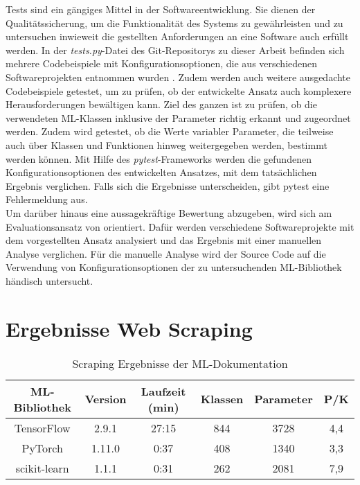 \documentclass[german,bachelor]{swsLeipzig}
\begin{document}
\noindent Tests sind ein gängiges Mittel in der Softwareentwicklung.
Sie dienen der Qualitätssicherung, um die Funktionalität des Systems zu gewährleisten und zu untersuchen inwieweit
die gestellten Anforderungen an eine Software auch erfüllt werden.
In der \textit{tests.py}-Datei des Git-Repositorys zu dieser Arbeit befinden sich mehrere Codebeispiele mit Konfigurationsoptionen, die aus
verschiedenen Softwareprojekten entnommen wurden \cite[]{marco}.
Zudem werden auch weitere ausgedachte Codebeispiele getestet, um zu prüfen, ob der entwickelte
Ansatz auch komplexere Herausforderungen bewältigen kann.
Ziel des ganzen ist zu prüfen, ob die verwendeten ML-Klassen inklusive der Parameter richtig erkannt und zugeordnet werden.
Zudem wird getestet, ob die Werte variabler Parameter, die teilweise auch über Klassen und Funktionen hinweg weitergegeben werden,
bestimmt werden können.
Mit Hilfe des \textit{pytest}-Frameworks werden die gefundenen Konfigurationsoptionen des entwickelten Ansatzes,
mit dem tatsächlichen Ergebnis verglichen.
Falls sich die Ergebnisse unterscheiden, gibt pytest eine Fehlermeldung aus.\\
\indent Um darüber hinaus eine aussagekräftige Bewertung abzugeben, wird sich am Evaluationsansatz von \citeauthor{10.1145/1985793.1985812}
orientiert.
Dafür werden verschiedene Softwareprojekte mit dem vorgestellten Ansatz analysiert und das Ergebnis mit einer manuellen Analyse verglichen.
Für die manuelle Analyse wird der Source Code auf die Verwendung von Konfigurationsoptionen der zu untersuchenden ML-Bibliothek
händisch untersucht.\\

\section{Ergebnisse Web Scraping}
\begin{table}[H]
\small
\begin{center}
\begin{tabular}[h]{c|c|c|c|c|c}
\hline
ML-Bibliothek & Version & Laufzeit (min) & Klassen & Parameter & P/K\\
\hline \hline
TensorFlow & 2.9.1 & 27:15 & 844 & 3728 & 4,4\\
PyTorch & 1.11.0 & 0:37 & 408 & 1340 & 3,3 \\
scikit-learn & 1.1.1 & 0:31 & 262 & 2081 & 7,9\\
\hline
\end{tabular}
\caption{Scraping Ergebnisse der ML-Dokumentation} \label{scrapresults}
\end{center}
\end{table}
\end{document}
